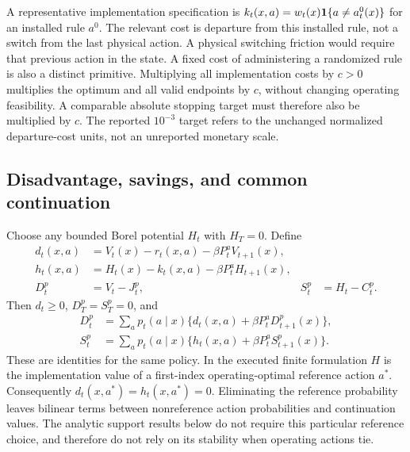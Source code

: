 A representative implementation specification is $k_t(x,a)=w_t(x)\mathbf 1\{a\ne a_t^0(x)\}$ for an installed rule $a^0$. The relevant cost is departure from this installed rule, not a switch from the last physical action. A physical switching friction would require that previous action in the state. A fixed cost of administering a randomized rule is also a distinct primitive. Multiplying all implementation costs by $c>0$ multiplies the optimum and all valid endpoints by $c$, without changing operating feasibility. A comparable absolute stopping target must therefore also be multiplied by $c$. The reported $10^{-3}$ target refers to the unchanged normalized departure-cost units, not an unreported monetary scale.

\subsection{Disadvantage, savings, and common continuation}
Choose any bounded Borel potential $H_t$ with $H_T=0$. Define
\begin{align}
 d_t(x,a)&=V_t(x)-r_t(x,a)-\beta P_t^aV_{t+1}(x),\label{eq:d45}\\
 h_t(x,a)&=H_t(x)-k_t(x,a)-\beta P_t^aH_{t+1}(x),\label{eq:h45}\\
 D_t^p&=V_t-J_t^p, & S_t^p&=H_t-C_t^p.\nonumber
\end{align}
Then $d_t\ge0$, $D_T^p=S_T^p=0$, and
\begin{align}
 D_t^p&=\sum_a p_t(a\mid x)\{d_t(x,a)+\beta P_t^aD_{t+1}^p(x)\},\label{eq:D45}\\
 S_t^p&=\sum_a p_t(a\mid x)\{h_t(x,a)+\beta P_t^aS_{t+1}^p(x)\}.\label{eq:S45}
\end{align}
These are identities for the same policy. In the executed finite formulation $H$ is the implementation value of a first-index operating-optimal reference action $a^*$. Consequently $d_t(x,a^*)=h_t(x,a^*)=0$. Eliminating the reference probability leaves bilinear terms between nonreference action probabilities and continuation values. The analytic support results below do not require this particular reference choice, and therefore do not rely on its stability when operating actions tie.
